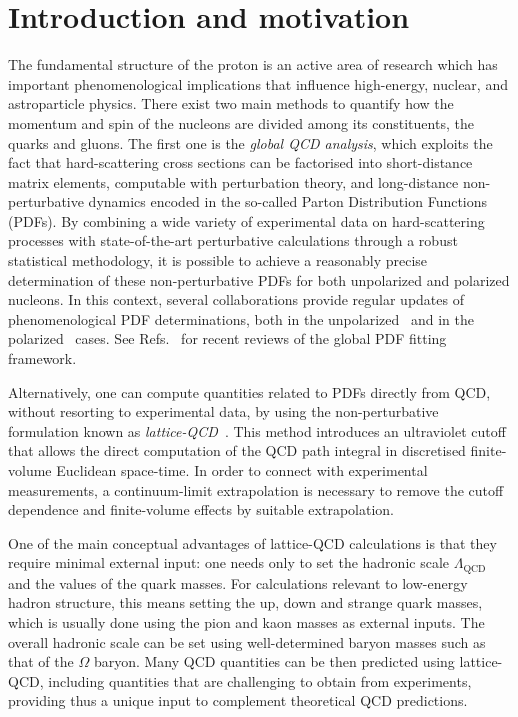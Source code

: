 \section{Introduction and motivation}


The fundamental structure of the proton is an active area of research
which has important phenomenological implications that influence
high-energy, nuclear, and astroparticle physics.
%
There exist two main methods to quantify how the momentum and spin of
the nucleons
are divided among its constituents, the quarks and gluons.
%
The first one
is the {\it global QCD analysis}, which exploits the fact that hard-scattering
cross sections can be factorised into short-distance matrix elements,
computable with perturbation theory, and long-distance
non-perturbative dynamics encoded in the
so-called Parton Distribution Functions (PDFs).
%
By combining a wide variety of experimental data on hard-scattering processes
with state-of-the-art perturbative calculations through a robust statistical
methodology, it is possible to achieve a reasonably precise determination
of these non-perturbative PDFs for both unpolarized and polarized nucleons.
%
In this context, several collaborations provide regular updates of
phenomenological PDF determinations, both
in the unpolarized~\cite{Ball:2014uwa,Ball:2017nwa,Harland-Lang:2014zoa,
Dulat:2015mca,Alekhin:2017kpj,Owens:2012bv} and in
the polarized~\cite{Nocera:2014gqa,deFlorian:2009vb,
  Sato:2016tuz,Hirai:2008aj} cases.
%
See Refs.~\cite{Rojo:2015acz,Butterworth:2015oua,Ball:2012wy,
Alekhin:2011sk,Forte:2013wc,Forte:2010dt,Perez:2012um,DeRoeck:2011na,
Accardi:2016ndt,Gao:2017yyd}
for recent reviews of the global PDF fitting framework.

Alternatively, one can compute quantities related to PDFs directly 
from QCD, without resorting to
experimental data, by using the non-perturbative formulation known as
{\it lattice-QCD}~\cite{Olive:2016xmw,Gupta:1997nd}.
%
This method introduces an ultraviolet cutoff that allows the direct 
computation of the QCD path integral in discretised finite-volume 
Euclidean space-time.
%
In order to connect with experimental measurements, a 
continuum-limit extrapolation is necessary to remove the cutoff dependence 
and finite-volume effects  by suitable extrapolation.

One of the main
conceptual advantages of lattice-QCD calculations is that
they require minimal external input: one needs only to 
set the hadronic scale $\Lambda_\text{QCD}$ and the values of the quark masses.
%
For calculations relevant to low-energy hadron structure, this means
setting the up, down and strange quark masses,
which is usually done using the pion and kaon masses as external inputs.
%
The overall hadronic scale can be set using well-determined baryon masses 
such as that of the $\Omega$ baryon.
%
Many QCD quantities can be then predicted 
using lattice-QCD, including quantities that are challenging to obtain from
experiments, providing thus a unique input to complement theoretical QCD
predictions.

